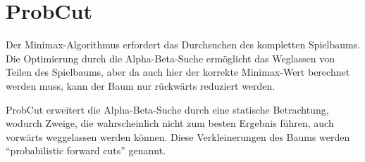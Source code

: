 \section{ProbCut}

Der Minimax-Algorithmus erfordert das Durchsuchen des kompletten Spielbaums.
Die Optimierung durch die Alpha-Beta-Suche ermöglicht das Weglassen von Teilen des Spielbaums, aber da auch hier der korrekte Minimax-Wert berechnet werden muss, kann der Baum nur rückwärts reduziert werden.

ProbCut erweitert die Alpha-Beta-Suche durch eine statische Betrachtung, wodurch Zweige, die wahrscheinlich nicht zum besten Ergebnis führen, auch vorwärts weggelassen werden können.
Diese Verkleinerungen des Baums werden "`probabilistic forward cuts"' genannt.
\cite[S.~1]{probcut}

